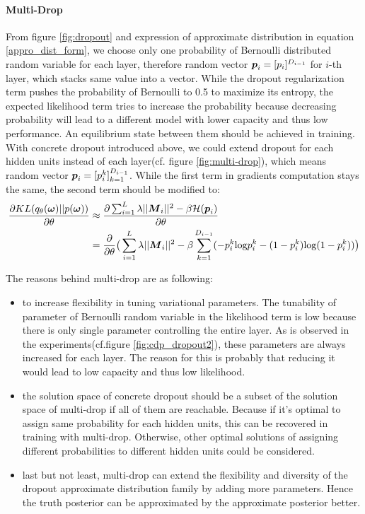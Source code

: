 \paragraph{Multi-Drop}
From figure \ref{fig:dropout} and expression of approximate distribution in equation \ref{appro_dist_form}, we choose only one probability of Bernoulli distributed random variable for each layer, therefore random vector $\boldsymbol p_i = [p_i]^{D_{i-1}}$ for $i$-th layer, which stacks same value into a vector. While the dropout regularization term pushes the probability of Bernoulli to 0.5 to maximize its entropy, the expected likelihood term tries to increase the probability because decreasing probability will lead to a different model with lower capacity and thus low performance. An equilibrium state between them should be achieved in training. With concrete dropout introduced above, we could extend dropout for each hidden units instead of each layer(cf. figure \ref{fig:multi-drop}), which means random vector $\boldsymbol p_i = [p_i^k]_{k=1}^{D_{i-1}}$. While the first term in gradients computation stays the same, the second term should be modified to:
\begin{equation} 
\begin{aligned}\label{KL_grad_multi}
\frac{\partial KL(q_{\theta}(\boldsymbol \omega)||p(\boldsymbol \omega))}{\partial \theta} 
&\approx \frac{\partial \sum_{i=1}^{L}\lambda||\boldsymbol M_{i}||^{2}- \beta \mathcal H(\boldsymbol p_{i})}{\partial \theta}  \\
&= \frac{\partial}{\partial \theta} \big( \sum_{i=1}^{L}\lambda||\boldsymbol M_{i}||^{2}- \beta \sum_{k=1}^{D_{i-1}}(-p_i^k\text{log}p_i^k - (1-p_i^k)\text{log}(1-p_i^k))\big)
\end{aligned}
\end{equation}  

The reasons behind multi-drop are as following:
\begin{itemize}
\item to increase flexibility in tuning variational parameters. The tunability of parameter of Bernoulli random variable in the likelihood term is low because there is only single parameter controlling the entire layer. As is observed in the experiments(cf.figure \ref{fig:cdp_dropout2}), these parameters are always increased for each layer. The reason for this is probably that reducing it would lead to low capacity and thus low likelihood. 

\item the solution space of concrete dropout should be a subset of the solution space of multi-drop if all of them are reachable. Because if it's optimal to assign same probability for each hidden units, this can be recovered in training with multi-drop. Otherwise, other optimal solutions of assigning different probabilities to different hidden units could be considered.

\item last but not least, multi-drop can extend the flexibility and diversity of the dropout approximate distribution family by adding more parameters. Hence the truth posterior can be approximated by the approximate posterior better.
 
\end{itemize}

